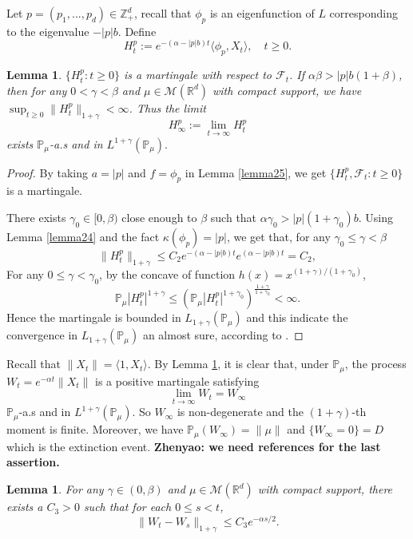 \documentclass[12pt, a4paper]{amsart}
\newtheorem{lem}[thm]{Lemma}
\theoremstyle{definition}
\numberwithin{equation}{section}
\begin{document}
Let $p=(p_1,...,p_d)\in \mathbb{Z}_+^d$, recall that $\phi_p$ is an eigenfunction of $L$ corresponding to the eigenvalue $-|p|b$. Define
$$H_t^p:=e^{-(\alpha-|p|b)t}\langle\phi_p,X_t\rangle, \quad t\geq 0.$$

\begin{lem}\label{lemma26}
$\{H_t^p: t\geq0\}$ is a martingale with respect to $\mathcal{F}_t$. If $\alpha\beta>|p|b(1+\beta)$, then for any $0< \gamma<\beta$ and $\mu \in \mathcal{M}(\mathbb{R}^d)$ with compact support, we have $\sup_{t\geq 0}\|H_t^p\|_{1+\gamma}< \infty$. Thus the limit
$$H_{\infty}^p:=\lim_{t\rightarrow \infty}H_t^p$$
exists $\mathbb{P}_{\mu}$-a.s and in $L^{1+\gamma}(\mathbb{P}_{\mu}).$
\end{lem}
\begin{proof}
    By taking $a=|p|$ and $f=\phi_p$ in Lemma \ref{lemma25}, we get $\{H_t^p, \mathcal{F}_t:t\geq 0\}$ is a martingale.

    There exists $\gamma_0 \in [0,\beta)$ close enough to $\beta$ such that $\alpha\gamma_0>|p|(1+\gamma_0)b$. Using  Lemma \ref{lemma24} and the fact $\kappa(\phi_p)=|p|$, we get that, for any $\gamma_0\leq\gamma<\beta$
    $$\|H_t^p\|_{1+\gamma}\leq C_2e^{-(\alpha-|p|b)t}e^{(\alpha-|p|b)t}=C_2,$$
 For any $0\leq\gamma<\gamma_0$, by the concave of function $h(x)=x^{(1+\gamma)/(1+\gamma_0)}$,
    $$\mathbb{P}_{\mu}|H_t^p|^{1+\gamma}\leq(\mathbb{P}_{\mu}|H_t^p|^{1+\gamma_0})^{\frac{1+\gamma}{1+\gamma_0}}<\infty.$$
    Hence the martingale is bounded in $L_{1+\gamma}(\mathbb{P}_{\mu})$ and this indicate the convergence in $L_{1+\gamma}(\mathbb{P}_{\mu}) $ an almost sure,
    according to \cite[Theorem 5.4.5]{Durrett2010Probability}.
\end{proof}


    Recall that $\|X_t\|=\langle 1,X_t\rangle$.
    By Lemma \ref{lemma26},
    it is clear that,
    under $\mathbb{P}_{\mu}$, the process $W_t=e^{-\alpha t}\|X_t\|$ is a positive martingale satisfying
$$\lim_{t\rightarrow \infty} W_t= W_{\infty}$$
$\mathbb{P}_{\mu}$-a.s and in $L^{1+\gamma}(\mathbb{P}_{\mu})$. So $W_{\infty}$ is non-degenerate and the $(1+\gamma)$-th moment is finite. Moreover, we have $\mathbb{P}_{\mu}(W_{\infty})=\|\mu\|$ and $\{W_{\infty}=0\}=D$ which is the extinction event.
    {\bf Zhenyao: we need references for the last assertion.}
\begin{lem}\label{lemma27}
 For any $\gamma\in (0,\beta)$ and $\mu\in \mathcal M(\mathbb R^d)$ with compact support, there exists a $C_3> 0$ such that for each $0\leq s<t$,
 $$\|W_t-W_s\|_{1+\gamma}\leq C_3 e^{-\alpha s/2}.$$
\end{lem}
\end{document}
